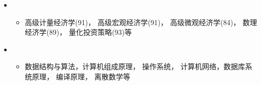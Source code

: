   \begin{itemize}[leftmargin=*]
    \item
      {\small
      \begin{itemize}
        \item{高级计量经济学(91)， 高级宏观经济学(91)， 高级微观经济学(84)， 数理经济学(89)， 量化投资策略(93)等}
      \end{itemize}
      }
    \item
      {\small
      \begin{itemize}
        \item{数据结构与算法，计算机组成原理， 操作系统， 计算机网络，数据库系统原理， 编译原理， 离散数学等}
      \end{itemize}
      }
  \end{itemize}